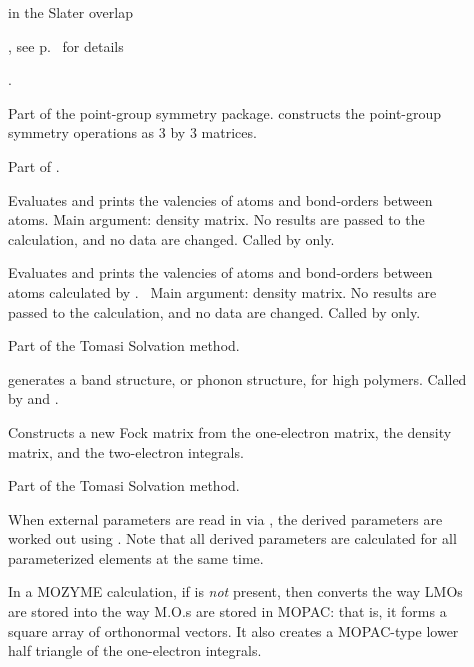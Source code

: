 \begin{description}
\item[]  in the Slater overlap
\begin{latexonly}
, see
p.~\pageref{ab} for details
\end{latexonly}.

\item[] Part of the point-group symmetry package.    
constructs the point-group symmetry operations as 3 by 3 matrices.
\item[] Part of .

\item[] Evaluates and prints the valencies of atoms and 
bond-orders between atoms. Main argument: density matrix. No results are passed
to the calculation, and no data  are changed. Called by  only.

\item[] Evaluates and prints the valencies of atoms and 
bond-orders between atoms calculated by . \ Main  argument:
density matrix.  No results are passed to the calculation, and no data  are
changed. Called by  only.

\item[] Part of the Tomasi Solvation method.

\item[]  generates a band structure,  or
phonon structure, for high polymers.  Called by  and
.

\item[] Constructs a new Fock matrix from the one-electron
matrix, the density matrix, and the two-electron integrals.

\item[] Part of the Tomasi Solvation method.

\item[] When external parameters are read in via ,
the derived parameters are worked out using .  Note that all
derived parameters are calculated for all parameterized elements at the same
time.

\item[] In a MOZYME calculation, if  is {\em not} 
present, then  converts the way LMOs are stored into the way M.O.s
are stored in MOPAC: that is, it forms a square array of orthonormal vectors.
It also creates a MOPAC-type lower half triangle of the one-electron integrals.


\end{description}
